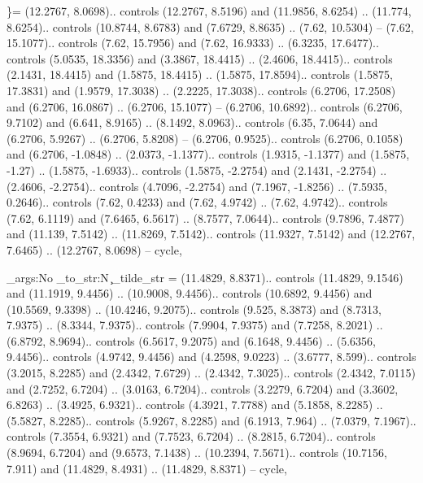 \}= {(12.2767, 8.0698).. controls (12.2767, 8.5196) and (11.9856, 8.6254) .. (11.774, 8.6254).. controls (10.8744, 8.6783) and (7.6729, 8.8635) .. (7.62, 10.5304) -- (7.62, 15.1077).. controls (7.62, 15.7956) and (7.62, 16.9333) .. (6.3235, 17.6477).. controls (5.0535, 18.3356) and (3.3867, 18.4415) .. (2.4606, 18.4415).. controls (2.1431, 18.4415) and (1.5875, 18.4415) .. (1.5875, 17.8594).. controls (1.5875, 17.3831) and (1.9579, 17.3038) .. (2.2225, 17.3038).. controls (6.2706, 17.2508) and (6.2706, 16.0867) .. (6.2706, 15.1077) -- (6.2706, 10.6892).. controls (6.2706, 9.7102) and (6.641, 8.9165) .. (8.1492, 8.0963).. controls (6.35, 7.0644) and (6.2706, 5.9267) .. (6.2706, 5.8208) -- (6.2706, 0.9525).. controls (6.2706, 0.1058) and (6.2706, -1.0848) .. (2.0373, -1.1377).. controls (1.9315, -1.1377) and (1.5875, -1.27) .. (1.5875, -1.6933).. controls (1.5875, -2.2754) and (2.1431, -2.2754) .. (2.4606, -2.2754).. controls (4.7096, -2.2754) and (7.1967, -1.8256) .. (7.5935, 0.2646).. controls (7.62, 0.4233) and (7.62, 4.9742) .. (7.62, 4.9742).. controls (7.62, 6.1119) and (7.6465, 6.5617) .. (8.7577, 7.0644).. controls (9.7896, 7.4877) and (11.139, 7.5142) .. (11.8269, 7.5142).. controls (11.9327, 7.5142) and (12.2767, 7.6465) .. (12.2767, 8.0698) -- cycle},

{\exp_args:No \cs_to_str:N \c_tilde_str} = {(11.4829, 8.8371).. controls (11.4829, 9.1546) and (11.1919, 9.4456) .. (10.9008, 9.4456).. controls (10.6892, 9.4456) and (10.5569, 9.3398) .. (10.4246, 9.2075).. controls (9.525, 8.3873) and (8.7313, 7.9375) .. (8.3344, 7.9375).. controls (7.9904, 7.9375) and (7.7258, 8.2021) .. (6.8792, 8.9694).. controls (6.5617, 9.2075) and (6.1648, 9.4456) .. (5.6356, 9.4456).. controls (4.9742, 9.4456) and (4.2598, 9.0223) .. (3.6777, 8.599).. controls (3.2015, 8.2285) and (2.4342, 7.6729) .. (2.4342, 7.3025).. controls (2.4342, 7.0115) and (2.7252, 6.7204) .. (3.0163, 6.7204).. controls (3.2279, 6.7204) and (3.3602, 6.8263) .. (3.4925, 6.9321).. controls (4.3921, 7.7788) and (5.1858, 8.2285) .. (5.5827, 8.2285).. controls (5.9267, 8.2285) and (6.1913, 7.964) .. (7.0379, 7.1967).. controls (7.3554, 6.9321) and (7.7523, 6.7204) .. (8.2815, 6.7204).. controls (8.9694, 6.7204) and (9.6573, 7.1438) .. (10.2394, 7.5671).. controls (10.7156, 7.911) and (11.4829, 8.4931) .. (11.4829, 8.8371) -- cycle},
